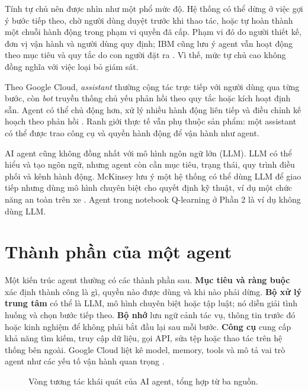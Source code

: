 \documentclass[12pt,a4paper]{report}
\begin{document}
Tính tự chủ nên được nhìn như một phổ mức độ. Hệ thống có thể dừng ở việc gợi ý bước
tiếp theo, chờ người dùng duyệt trước khi thao tác, hoặc tự hoàn thành một chuỗi hành
động trong phạm vi quyền đã cấp. Phạm vi đó do người thiết kế, đơn vị vận hành và người
dùng quy định; IBM cũng lưu ý agent vẫn hoạt động theo mục tiêu và quy tắc do con người
đặt ra \cite{ibm}. Vì thế, mức tự chủ cao không đồng nghĩa với việc loại bỏ giám sát.

Theo Google Cloud, \emph{assistant} thường cộng tác trực tiếp với người dùng qua từng
bước, còn \emph{bot} truyền thống chủ yếu phản hồi theo quy tắc hoặc kích hoạt định
sẵn. Agent có thể chủ động hơn, xử lý nhiều hành động liên tiếp và điều chỉnh kế hoạch
theo phản hồi \cite{google}. Ranh giới thực tế vẫn phụ thuộc sản phẩm: một assistant có
thể được trao công cụ và quyền hành động để vận hành như agent.

AI agent cũng không đồng nhất với mô hình ngôn ngữ lớn (LLM). LLM có thể hiểu và tạo
ngôn ngữ, nhưng agent còn cần mục tiêu, trạng thái, quy trình điều phối và kênh hành
động. McKinsey lưu ý một hệ thống có thể dùng LLM để giao tiếp nhưng dùng mô hình
chuyên biệt cho quyết định kỹ thuật, ví dụ một chức năng an toàn trên xe
\cite{mckinsey}. Agent trong notebook Q-learning ở Phần 2 là ví dụ không dùng LLM.

\section{Thành phần của một agent}
Một kiến trúc agent thường có các thành phần sau. \textbf{Mục tiêu và ràng buộc} xác
định thành công là gì, quyền nào được dùng và khi nào phải dừng. \textbf{Bộ xử lý trung
tâm} có thể là LLM, mô hình chuyên biệt hoặc tập luật; nó diễn giải tình huống và chọn
bước tiếp theo. \textbf{Bộ nhớ} lưu ngữ cảnh tác vụ, thông tin trước đó hoặc kinh nghiệm
để không phải bắt đầu lại sau mỗi bước. \textbf{Công cụ} cung cấp khả năng tìm kiếm,
truy cập dữ liệu, gọi API, sửa tệp hoặc thao tác trên hệ thống bên ngoài. Google Cloud
liệt kê model, memory, tools và mô tả vai trò agent như các yếu tố vận hành quan trọng
\cite{google}.

\begin{figure}[H]
\centering
{}
\caption{Vòng tương tác khái quát của AI agent, tổng hợp từ ba nguồn.}
\end{figure}
\end{document}
